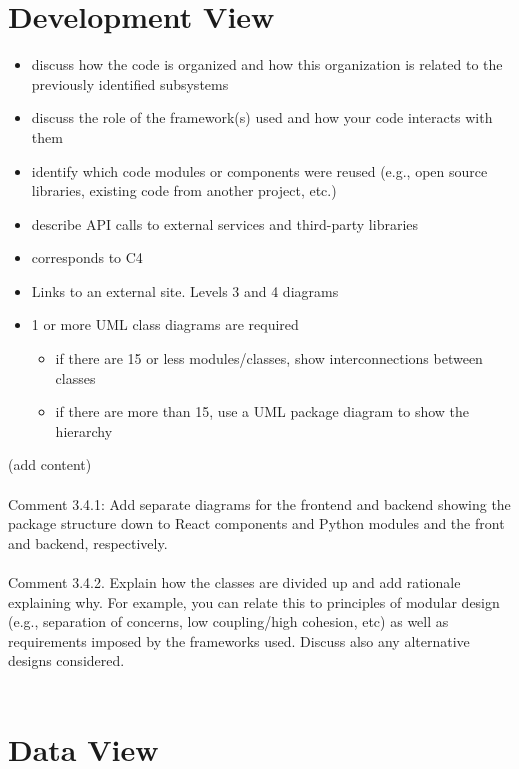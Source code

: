 \documentclass[oneside,openany,obeyspaces]{book}
\newcommand\tab[1][1cm]{\hspace*{#1}}
\begin{document}
\begin{flushleft}
    \section{Development View}
    \begin{itemize}
        \item discuss how the code is organized and how this organization is related to the previously identified subsystems
        \item discuss the role of the framework(s) used and how your code interacts with them
        \item identify which code modules or components were reused (e.g., open source libraries, existing code from another project, etc.)
        \item describe API calls to external services and third-party libraries
        \item corresponds to C4
        \item Links to an external site. Levels 3 and 4 diagrams
        \item 1 or more UML class diagrams are required
              \begin{itemize}
                  \item if there are 15 or less modules/classes, show interconnections between classes
                  \item if there are more than 15, use a UML package diagram to show the hierarchy
              \end{itemize}
    \end{itemize}

    \tab (add content)\\~\\
    {\color{red}Comment 3.4.1: Add separate diagrams for the frontend and backend showing the package structure down to React components and Python modules and the front and backend, respectively. \\~\\}
    {\color{red}Comment 3.4.2.	Explain how the classes are divided up and add rationale explaining why. For example, you can relate this to principles of modular design (e.g., separation of concerns, low coupling/high cohesion, etc) as well as requirements imposed by the frameworks used. Discuss also any alternative designs considered.\\~\\}


    \section{Data View}


\end{flushleft}
\end{document}
